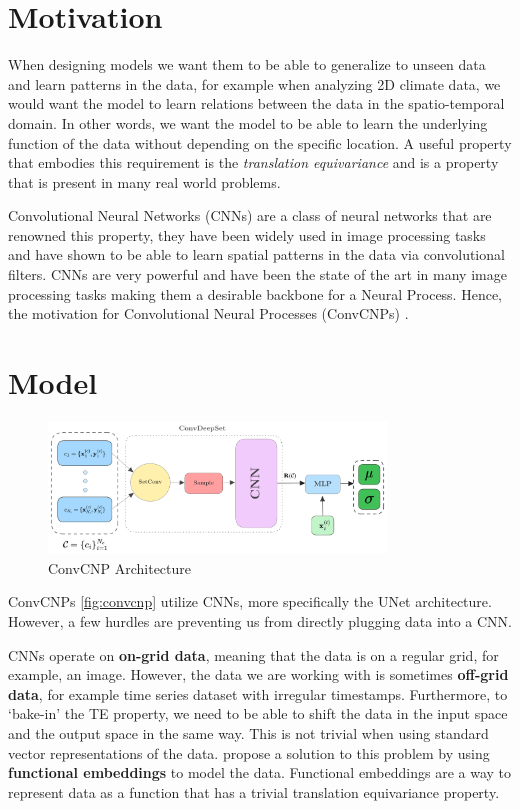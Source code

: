 \documentclass[../../main.tex]{subfiles}
\begin{document}
\section{Motivation}

When designing models we want them to be able to generalize to unseen data and learn patterns in the data, for example when analyzing 2D climate data, we would want the model to learn relations between the data in the spatio-temporal domain. In other words, we want the model to be able to learn the underlying function of the data without depending on the specific location. A useful property that embodies this requirement is the \textit{translation equivariance} and is a property that is present in many real world problems.

Convolutional Neural Networks (CNNs) are a class of neural networks that are renowned this property, they have been widely used in image processing tasks and have shown to be able to learn spatial patterns in the data via convolutional filters. CNNs are very powerful and have been the state of the art in many image processing tasks making them a desirable backbone for a Neural Process. Hence, the motivation for Convolutional Neural Processes (ConvCNPs) \cite{gordon2020convolutional}.

\section{Model}

\begin{figure}[H]
	\centering
	\includegraphics[width=0.8\textwidth]{convcnp.png}
	\caption{ConvCNP Architecture}
	\label{fig:convcnp}
\end{figure}


ConvCNPs \cite{gordon2020convolutional} \autoref{fig:convcnp} utilize CNNs, more specifically the UNet architecture. However, a few hurdles are preventing us from directly plugging data into a CNN.


CNNs operate on \textbf{on-grid data}, meaning that the data is on a regular grid, for example, an image. However, the data we are working with is sometimes \textbf{off-grid data}, for example time series dataset with irregular timestamps. Furthermore, to `bake-in' the TE property, we need to be able to shift the data in the input space and the output space in the same way. This is not trivial when using standard vector representations of the data. \cite{gordon2020convolutional} propose a solution to this problem by using \textbf{functional embeddings} to model the data. Functional embeddings are a way to represent data as a function that has a trivial translation equivariance property. 
\end{document}
